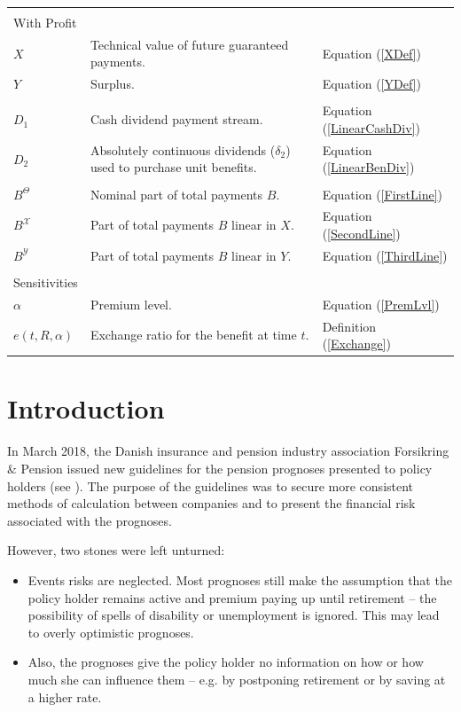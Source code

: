 \documentclass{article}
\newcommand{\1}[1]{\mathbbm{1}_{\left\lbrace #1 \right\rbrace}}
\theoremstyle{break}
\theoremstyle{remark}
\numberwithin{equation}{section}
\begin{document}
\begin{table}[H]
\begin{tabular}{lll}
		&&\\
		With Profit&&\\
		\hline
		$X$& Technical value of future guaranteed payments. & Equation (\ref{XDef})\\
		$Y$& Surplus. & Equation (\ref{YDef}) \\
		&&\\
		$D_1$& Cash dividend payment stream. & Equation (\ref{LinearCashDiv})\\
		$D_2$& Absolutely continuous dividends ($\delta_2$) used to purchase unit benefits. & Equation (\ref{LinearBenDiv}) \\
		&&\\
		$B^\Theta$& Nominal part of total payments $B$. & Equation (\ref{FirstLine}) \\
		$B^\mathcal{X}$& Part of total payments $B$ linear in $X$. & Equation (\ref{SecondLine})\\
		$B^\mathcal{Y}$& Part of total payments $B$ linear in $Y$. & Equation (\ref{ThirdLine}) \\
		&&\\
		Sensitivities&&\\
		\hline
		$\alpha$& Premium level. & Equation (\ref{PremLvl}) \\
		$e(t,R,\alpha)$& Exchange ratio for the benefit at time $t$. & Definition (\ref{Exchange})
	\end{tabular}
\end{table}

\newpage

\section{Introduction}

In March 2018, the Danish insurance and pension industry association Forsikring \& Pension issued new guidelines for the pension prognoses presented to policy holders (see \cite{Henstilling}). The purpose of the guidelines was to secure more consistent methods of calculation between companies and to present the financial risk associated with the prognoses.

However, two stones were left unturned:

\begin{itemize}
	\item Events risks are neglected. Most prognoses still make the assumption that the policy holder remains active and premium paying up until retirement -- the possibility of spells of disability or unemployment is ignored. This may lead to overly optimistic prognoses.
	\item Also, the prognoses give the policy holder no information on how or how much she can influence them -- e.g. by postponing retirement or by saving at a higher rate.
\end{itemize}
\end{document}
